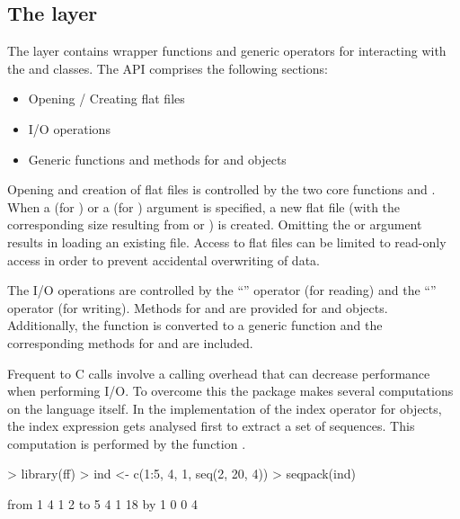 \documentclass[12pt,a4paper]{article}
\begin{document}
\subsection{The \R{} layer}

The \R{} layer contains wrapper functions and generic operators for interacting with the  and  classes. 
The API comprises the following sections:
\begin{itemize}
  \item Opening / Creating  flat files
  \item I/O operations
  \item Generic functions and methods for  and  objects
\end{itemize}

Opening and creation of flat files is controlled by the two core functions  and . 
When a  (for ) or a  (for ) argument is specified, a new flat file (with the corresponding size resulting from  or ) is created. 
Omitting the  or  argument results in loading an existing file. 
Access to flat files can be limited to read-only access in order to prevent accidental overwriting of data.

The I/O operations are controlled by the ``\rc{[\,]}'' operator (for reading) and the ``\rc{[\,]<-}'' operator (for writing). 
Methods for  and  are provided for  and  objects. 
Additionally, the function  is converted to a generic function and the corresponding methods for  and  are included.

Frequent \R{} to C calls involve a calling overhead that can decrease performance when
performing I/O.
To overcome this the  package makes several computations on the \R{} language itself.
In the implementation of the index operator for  objects, the index expression gets analysed first to extract a set of sequences.
This computation is performed by the function .
 
\begin{Schunk}
\begin{Sinput}
> library(ff)
> ind <- c(1:5, 4, 1, seq(2, 20, 4))
> seqpack(ind)
\end{Sinput}
\begin{Soutput}
     [,1] [,2] [,3] [,4]
from    1    4    1    2
to      5    4    1   18
by      1    0    0    4
\end{Soutput}
\end{Schunk}
\end{document}
